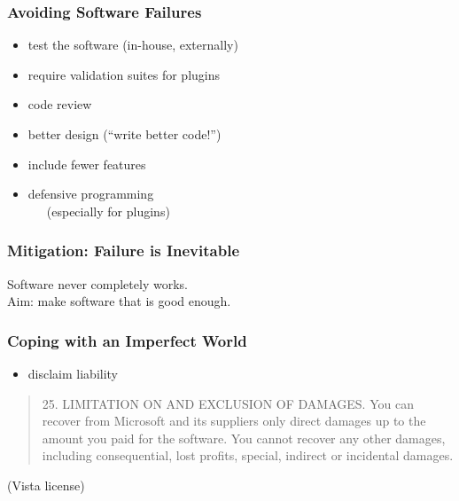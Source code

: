 \documentclass{beamer}
\newenvironment{changemargin}[1]{%
  \begin{list}{}{%
    \setlength{\topsep}{0pt}%
    \setlength{\leftmargin}{#1}%
    \setlength{\rightmargin}{1em}
    \setlength{\listparindent}{\parindent}%
    \setlength{\itemindent}{\parindent}%
    \setlength{\parsep}{\parskip}%
  }%
  \item[]}{\end{list}}
\begin{document}
\begin{frame}
  \frametitle{Avoiding Software Failures}

  \Large
    \begin{changemargin}{2em}
  \begin{itemize}
   \item test the software (in-house, externally)
   \item require validation suites for plugins
   \item code review
   \item better design (``write better code!'')
   \item include fewer features
   \item defensive programming \\~~~(especially for plugins)
  \end{itemize}
    \end{changemargin}
  
\end{frame}

\begin{frame}
  \frametitle{Mitigation: Failure is Inevitable}

  \Large
  \begin{changemargin}{2em}
  Software never completely works.\\[1em]

  Aim: make software that is good enough.
  \end{changemargin}

\end{frame}

\begin{frame}
  \frametitle{Coping with an Imperfect World}

    \begin{changemargin}{2em}
{\Large
  \begin{itemize}
   \item disclaim liability
  \end{itemize}
}
\begin{quote}
25. LIMITATION ON AND EXCLUSION OF DAMAGES. You can recover from
Microsoft and its suppliers only direct damages up to the amount you
paid for the software. You cannot recover any other damages, including
consequential, lost profits, special, indirect or incidental damages.
\end{quote}
\hfill (Vista license)
    \end{changemargin}
    
\end{frame}
\end{document}
